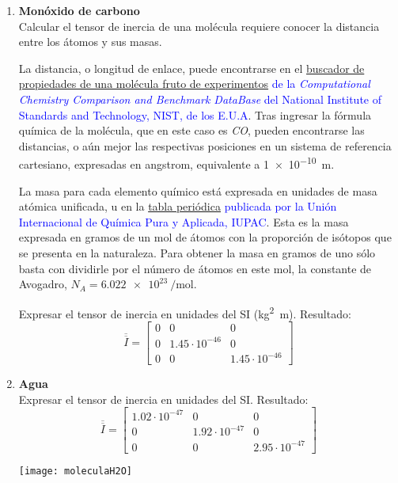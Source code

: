 \documentclass[11pt, spanish, a4paper, twoside]{article}
\begin{document}
\begin{enumerate}
	\item
	\textbf{Monóxido de carbono}\\
	Calcular el tensor de inercia de una molécula requiere conocer la distancia entre los átomos y sus masas.

	La distancia, o longitud de enlace, puede encontrarse en el \textcolor{blue}{\href{https://cccbdb.nist.gov/exp1x.asp}{buscador de propiedades de una molécula fruto de experimentos} de la \emph{Computational Chemistry Comparison and Benchmark DataBase} del National Institute of Standards and Technology, NIST, de los E.U.A}.
	Tras ingresar la fórmula química de la molécula, que en este caso es \emph{CO}, pueden encontrarse las distancias, o aún mejor las respectivas posiciones en un sistema de referencia cartesiano, expresadas en \si{angstrom}, equivalente a \SI{1e-10}{\metre}.

	La masa para cada elemento químico está expresada en unidades de masa atómica unificada, \si{\atomicmassunit} en la \textcolor{blue}{\href{https://iupac.org/what-we-do/periodic-table-of-elements/}{tabla periódica} publicada por la Unión Internacional de Química Pura y Aplicada, IUPAC}.
	Esta es la masa expresada en gramos de un mol de átomos con la proporción de isótopos que se presenta en la naturaleza.
	Para obtener la masa en gramos de uno sólo basta con dividirle por el número de átomos en este mol, la constante de Avogadro, \(N_A = \SI{6.022e23}{\per\mole}\).
	
	Expresar el tensor de inercia en unidades del SI (\si{\kilogram \squared \metre}).
	Resultado:\\
	\[
		\overline{\overline{I}} = \left[\begin{matrix}0 & 0 & 0\\0 & 1.45 \cdot 10^{-46} & 0\\0 & 0 & 1.45 \cdot 10^{-46}\end{matrix}\right]
	\]



	\item 
	\begin{minipage}[t][3cm]{0.73\textwidth}
	\textbf{Agua}\\
		Expresar el tensor de inercia en unidades del SI.
		Resultado:\\
		\[
			\overline{\overline{I}} = \left[\begin{matrix}1.02 \cdot 10^{-47} & 0 & 0\\0 & 1.92 \cdot 10^{-47} & 0\\0 & 0 & 2.95 \cdot 10^{-47}\end{matrix}\right]
		\]
	\end{minipage}
	\begin{minipage}[c][0.5cm][t]{0.2\textwidth}
		\texttt{[image: moleculaH2O]}
	\end{minipage}


\end{enumerate}
\end{document}
